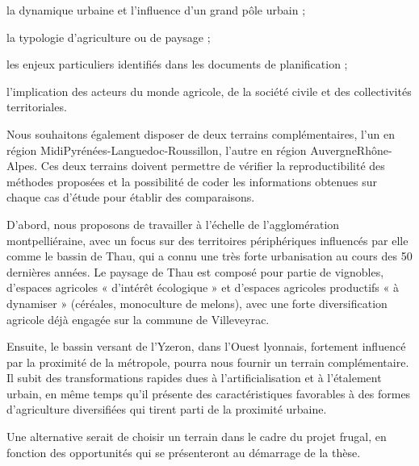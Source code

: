 \startitemize

\item la dynamique urbaine et l'influence d'un grand pôle urbain ;
\item la typologie d’agriculture ou de paysage ;
\item les enjeux particuliers identifiés dans les documents de planification ;
\item l'implication des acteurs du monde agricole, de la société civile
  et des collectivités territoriales.

\stopitemize

Nous souhaitons également disposer de deux terrains complémentaires,
l'un en région Midi\-Pyrénées-Languedoc-Roussillon, l'autre
en région Auvergne\-Rhône-Alpes. Ces deux terrains doivent permettre
de vérifier la reproductibilité des méthodes proposées
et la possibilité de coder les informations obtenues sur chaque cas d'étude
pour établir des comparaisons.

D'abord, nous proposons de travailler à l'échelle de l'agglomération montpelliéraine,
avec un focus sur des territoires périphériques influencés par elle
comme le bassin de Thau, qui a connu une très forte urbanisation
au cours des 50 dernières années. Le paysage de Thau est composé pour partie de vignobles,
d’espaces agricoles « d’intérêt écologique » et d’espaces agricoles
productifs « à dynamiser » (céréales, monoculture de melons),
avec une forte diversification agricole déjà engagée sur la commune de Villeveyrac.

Ensuite, le bassin versant de l'Yzeron, dans l'Ouest lyonnais,
fortement influencé par la proximité de la métropole,
pourra nous fournir un terrain complémentaire.
Il subit des transformations rapides dues à l'artificialisation et à l'étalement urbain,
en même temps qu'il présente des caractéristiques favorables à des formes d'agriculture diversifiées
qui tirent parti de la proximité urbaine.

Une alternative serait de choisir un terrain dans le cadre du projet {\sc frugal},
en fonction des opportunités qui se présenteront au démarrage de la thèse.